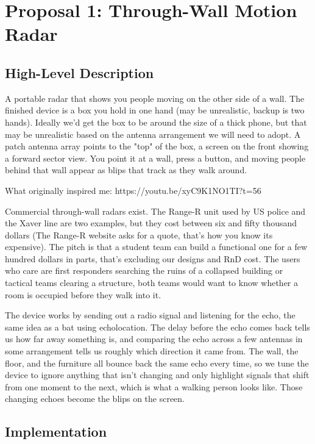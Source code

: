 \documentclass[11pt]{article}
\begin{document}
\section*{Proposal 1: Through-Wall Motion Radar}

\subsection*{High-Level Description}

A portable radar that shows you people moving on the other side of a wall. The finished device is a box you hold in one hand (may be unrealistic, backup is two hands). Ideally we'd get the box to be around the size of a thick phone, but that may be unrealistic based on the antenna arrangement we will need to adopt. A patch antenna array points to the "top" of the box, a screen on the front showing a forward sector view. You point it at a wall, press a button, and moving people behind that wall appear as blips that track as they walk around. 

What originally inspired me: https://youtu.be/xyC9K1NO1TI?t=56

Commercial through-wall radars exist. The Range-R unit used by US police and the Xaver line are two examples, but they cost between six and fifty thousand dollars (The Range-R website asks for a quote, that's how you know its expensive). The pitch is that a student team can build a functional one for a few hundred dollars in parts, that's excluding our designs and RnD cost. The users who care are first responders searching the ruins of a collapsed building or tactical teams clearing a structure, both teams would want to know whether a room is occupied before they walk into it. 

The device works by sending out a radio signal and listening for the echo, the same idea as a bat using echolocation. The delay before the echo comes back tells us how far away something is, and comparing the echo across a few antennas in some arrangement tells us roughly which direction it came from. The wall, the floor, and the furniture all bounce back the same echo every time, so we tune the device to ignore anything that isn't changing and only highlight signals that shift from one moment to the next, which is what a walking person looks like. Those changing echoes become the blips on the screen.

\subsection*{Implementation}
\end{document}
